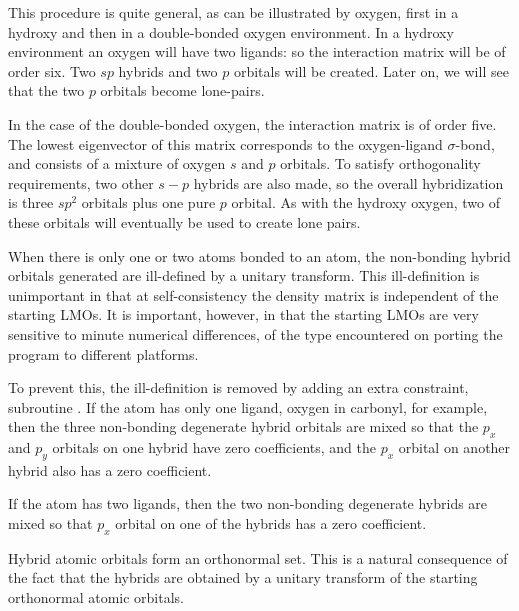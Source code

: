 This  procedure is quite general, as can be illustrated by oxygen, first in a
hydroxy and then in a double-bonded oxygen environment.  In a hydroxy
environment an oxygen will have two ligands: so the interaction  matrix will be
of order six.  Two $sp$ hybrids  and two $p$ orbitals will be  created.  Later
on, we will see that the two $p$ orbitals become lone-pairs.

In the case of the double-bonded oxygen, the interaction matrix is of  order
five.  The lowest eigenvector of this matrix corresponds to the oxygen-ligand
$\sigma$-bond, and consists of a mixture of oxygen $s$ and $p$ orbitals.  To
satisfy orthogonality requirements, two other $s-p$ hybrids are also made, so
the overall hybridization is three $sp^2$ orbitals plus one  pure $p$ orbital.
As with the hydroxy oxygen, two of these orbitals will eventually be used to 
create lone pairs. 

When there is only one or two atoms bonded to an atom, the non-bonding hybrid
orbitals generated are ill-defined by a unitary transform.  This ill-definition
is unimportant in that at self-consistency the density matrix is independent of
the starting LMOs.  It is important, however, in that the starting LMOs are
very sensitive to minute numerical differences, of the type encountered on
porting the program to different platforms.

To prevent this, the ill-definition is removed by adding an extra constraint,
subroutine . If the atom has only one ligand, oxygen in carbonyl,
for example, then the three non-bonding degenerate hybrid orbitals are mixed so
that the $p_x$ and $p_y$ orbitals on one hybrid have zero coefficients, and the
$p_x$ orbital on another hybrid also has a zero coefficient.

If the atom has two ligands, then the two non-bonding degenerate hybrids are
mixed so that $p_x$ orbital on one of the hybrids has a zero coefficient.

Hybrid atomic orbitals form an orthonormal set.  This is a natural consequence
of the fact that the hybrids are obtained by a unitary transform of the
starting orthonormal atomic orbitals.  

